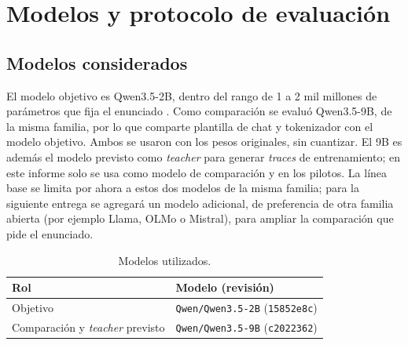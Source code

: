 \section{Modelos y protocolo de evaluación}
\label{sec:protocolo}

\subsection{Modelos considerados}
El modelo objetivo es Qwen3.5-2B, dentro del rango de 1 a 2 mil millones
de parámetros que fija el enunciado \citep{enunciado2026}. Como comparación se
evaluó Qwen3.5-9B, de la misma familia, por lo que comparte plantilla de chat y
tokenizador con el modelo objetivo. Ambos se usaron con los pesos originales,
sin cuantizar. El 9B es además el modelo previsto como \emph{teacher} para
generar \emph{traces} de entrenamiento; en este informe
solo se usa como modelo de comparación y en los pilotos. La línea base se limita
por ahora a estos dos modelos de la misma familia; para la siguiente entrega se
agregará un modelo adicional, de preferencia de otra familia abierta
(por ejemplo Llama, OLMo o Mistral), para ampliar la comparación que pide el
enunciado.

\begin{table}[htbp]
  \centering\small
  \caption{Modelos utilizados.}
  \label{tab:modelos}
  \begin{tabularx}{\linewidth}{@{}p{3.2cm}Y@{}}
    \toprule
    Rol & Modelo (revisión) \\
    \midrule
    Objetivo & \texttt{Qwen/Qwen3.5-2B} (\texttt{15852e8c}) \\
    Comparación y \emph{teacher} previsto & \texttt{Qwen/Qwen3.5-9B} (\texttt{c2022362}) \\
    \bottomrule
  \end{tabularx}
\end{table}

